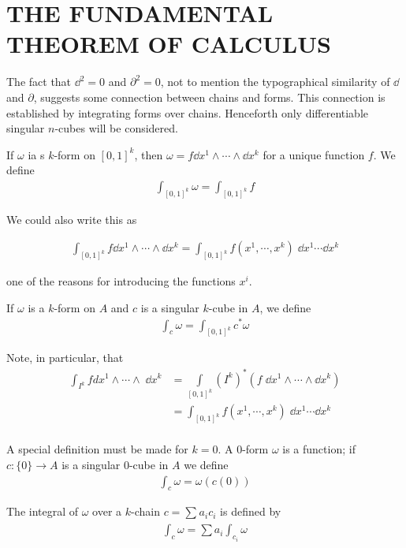 \newpage
\section{THE FUNDAMENTAL THEOREM OF CALCULUS}
The fact that $\dd^2 = 0$ and $\partial^2 = 0$, not to mention the typographical 
similarity of $\dd$ and $\partial$, suggests some connection between chains and forms. 
This connection is established by integrating forms over chains. Henceforth only 
differentiable singular $n$-cubes will be considered.

If $\omega$ ia s $k$-form on $[0,1]^k$, then $\omega = f\dd x^1\wedge\cdots\wedge\dd x^k$
for a unique function $f$. We define 
\begin{align*}
    \int_{[0,1]^k} \omega = \int_{[0,1]^k} f
\end{align*}

We could also write this as

\begin{align*}
    \int_{[0,1]^k} f\dd x^1\wedge\cdots\wedge\dd x^k = \int_{[0,1]^k} f(x^1,\cdots,x^k)\;\dd x^1\cdots\dd x^k
\end{align*}

one of the reasons for introducing the functions $x^i$. 

If $\omega$ is a $k$-form on $A$ and $c$ is a singular $k$-cube in $A$, we define
\begin{align*}
    \int_c\omega=\int_{[0,1]^k}c^*\omega
\end{align*}

Note, in particular, that
\begin{align*}
    \int_{I^k}fdx^1\wedge\cdots\wedge\;\dd x^k
    & = \int\limits_{[0,1]^k}(I^k)^*(f\;\dd x^1\wedge\cdots\wedge \dd x^k) \\
    & = \int_{[0,1]^k}f(x^1,\cdots,x^k)\; \dd x^1\cdots\dd x^k\\
\end{align*}

A special definition must be made for $k = 0$. A 0-form $\omega$ is a function; 
if $c:\{0\}\to A$ is a singular 0-cube in $A$ we define
\begin{align*}
    \int_c \omega = \omega(c(0))
\end{align*}

The integral of $\omega$ over a $k$-chain $c = \sum_{}^{}{a_ic_i}$ is defined by
\begin{align*}
    \int_c\omega=\sum a_i\int_{c_i}\omega
\end{align*}

